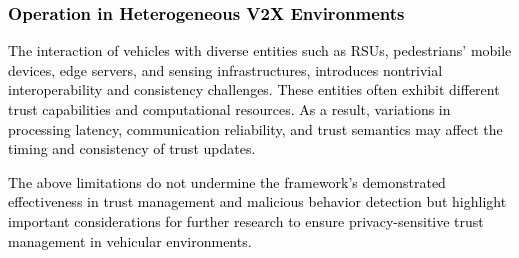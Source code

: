 \cite{cho2010survey}\documentclass[journal,comsoc,twoside]{IEEEtran}
\begin{document}
\textcolor{black}{
\subsubsection{Operation in Heterogeneous V2X Environments}
The interaction of vehicles with diverse entities such as RSUs, pedestrians’ mobile devices, edge servers, and sensing infrastructures, introduces nontrivial interoperability and consistency challenges. These entities often exhibit different trust capabilities and computational resources. As a result, variations in processing latency, communication reliability, and trust semantics may affect the timing and consistency of trust updates.}


\textcolor{black}{
The above limitations do not undermine the framework's demonstrated effectiveness in trust management and malicious behavior detection but highlight important considerations for further research to ensure privacy-sensitive trust management in vehicular environments.}
\end{document}
